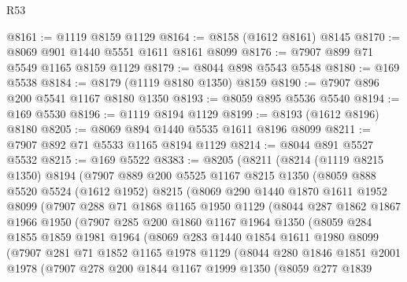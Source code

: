\begin{lexlean}{R53}
\begin{coremodule}
@8161 := @1119 @8159 @1129
@8164 := @8158 (@1612 @8161) @8145
@8170 := @8069 @901 @1440 @5551 @1611 @8161 @8099
@8176 := @7907 @899 @71 @5549 @1165 @8159 @1129
@8179 := @8044 @898 @5543 @5548
@8180 := @169 @5538
@8184 := @8179 (@1119 @8180 @1350) @8159
@8190 := @7907 @896 @200 @5541 @1167 @8180 @1350
@8193 := @8059 @895 @5536 @5540
@8194 := @169 @5530
@8196 := @1119 @8194 @1129
@8199 := @8193 (@1612 @8196) @8180
@8205 := @8069 @894 @1440 @5535 @1611 @8196 @8099
@8211 := @7907 @892 @71 @5533 @1165 @8194 @1129
@8214 := @8044 @891 @5527 @5532
@8215 := @169 @5522
@8383 := @8205
    (@8211
      (@8214
        (@1119 @8215 @1350)
        @8194
        (@7907
          @889
          @200
          @5525
          @1167
          @8215
          @1350
          (@8059
            @888
            @5520
            @5524
            (@1612 @1952)
            @8215
            (@8069
              @290
              @1440
              @1870
              @1611
              @1952
              @8099
              (@7907
                @288
                @71
                @1868
                @1165
                @1950
                @1129
                (@8044
                  @287
                  @1862
                  @1867
                  @1966
                  @1950
                  (@7907
                    @285
                    @200
                    @1860
                    @1167
                    @1964
                    @1350
                    (@8059
                      @284
                      @1855
                      @1859
                      @1981
                      @1964
                      (@8069
                        @283
                        @1440
                        @1854
                        @1611
                        @1980
                        @8099
                        (@7907
                          @281
                          @71
                          @1852
                          @1165
                          @1978
                          @1129
                          (@8044
                            @280
                            @1846
                            @1851
                            @2001
                            @1978
                            (@7907
                              @278
                              @200
                              @1844
                              @1167
                              @1999
                              @1350
                              (@8059
                                @277
                                @1839

\end{coremodule}
\end{lexlean}
